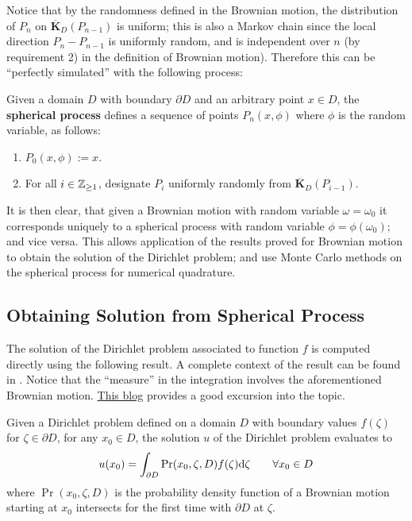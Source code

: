 \documentclass[10pt]{article}
\begin{document}
\textstart
Notice that by the randomness defined in the Brownian motion, the distribution of $P_n$ on $\overline{\bm{K}}_D(P_{n-1})$ is uniform; this is also a Markov chain since the local direction $P_n - P_{n-1}$ is uniformly random, and is independent over $n$ (by requirement 2) in the definition of Brownian motion). Therefore this can be ``perfectly simulated'' with the following process:

\begin{definition}
    Given a domain $D$ with boundary $\partial D$ and an arbitrary point $x \in D$, the \textbf{spherical process} defines a sequence of points $P_n(x, \phi)$ where $\phi$ is the random variable, as follows:
    \begin{enumerate}
        \item $P_0(x, \phi) := x$.
        \item For all $i \in \mathbb{Z}_{\geq 1}$, designate $P_i$ uniformly randomly from $\overline{\bm{K}}_D (P_{i-1})$. 
    \end{enumerate}
\end{definition}

It is then clear, that given a Brownian motion with random variable $\omega = \omega_0$ it corresponds uniquely to a spherical process with random variable $\phi = \phi(\omega_0)$; and vice versa. This allows application of the results proved for Brownian motion to obtain the solution of the Dirichlet problem; and use Monte Carlo methods on the spherical process for numerical quadrature.

\subsection{Obtaining Solution from Spherical Process}

\textstart
The solution of the Dirichlet problem associated to function $f$ is computed directly using the following result. A complete context of the result can be found in \cite{Kakutani1944}. Notice that the ``measure'' in the integration involves the aforementioned Brownian motion. \hyperlink{https://willierushrush.github.io/posts/2021/08/dirichlet-problem}{This blog} provides a good excursion into the topic. 

\begin{proposition}
    Given a Dirichlet problem defined on a domain $D$ with boundary values $f(\zeta)$ for $\zeta \in \partial D$, for any $x_0 \in D$, the solution $u$ of the Dirichlet problem evaluates to
    \[
        u(x_0) = \int_{\partial D} \mathrm{Pr}(x_0, \zeta, D) f(\zeta) \mathrm{d} \zeta \qquad \forall x_0 \in D
    \]
    where $\Pr(x_0, \zeta, D)$ is the probability density function of a Brownian motion starting at $x_0$ intersects for the first time with $\partial D$ at $\zeta$.
\end{proposition}
\end{document}

